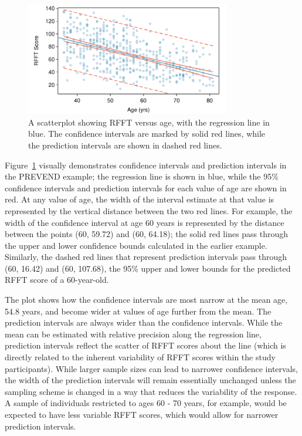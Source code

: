 \begin{figure}[h]
	\centering
	\includegraphics[width=0.8\textwidth]
	{ch_simple_linear_regression_oi_biostat/figures/prevendPredictionIntervalsSimpleRegression/prevendPredictionIntervalsSimpleRegression.pdf}
	\caption{A scatterplot showing RFFT versus age, with the regression line in blue. The confidence intervals are marked by solid red lines, while the prediction intervals are shown in dashed red lines.}
	\label{prevendPredictionIntervalsSimpleRegression}
\end{figure}

\textD{\newpage}

Figure~\ref{prevendPredictionIntervalsSimpleRegression} visually demonstrates confidence intervals and prediction intervals in the PREVEND example; the regression line is shown in blue, while the 95\% confidence intervals and prediction intervals for each value of age are shown in red. At any value of age, the width of the interval estimate at that value is represented by the vertical distance between the two red lines. For example, the width of the confidence interval at age 60 years is represented by the distance between the points (60, 59.72) and (60, 64.18); the solid red lines pass through the upper and lower confidence bounds calculated in the earlier example. Similarly, the dashed red lines that represent prediction intervals pass through (60, 16.42) and (60, 107.68), the 95\% upper and lower bounds for the predicted RFFT score of a 60-year-old.

The plot shows how the confidence intervals are most narrow at the mean age, 54.8 years, and become wider at values of age further from the mean. The prediction intervals are always wider than the confidence intervals. While the mean can be estimated with relative precision along the regression line, prediction intervals reflect the scatter of RFFT scores about the line (which is directly related to the inherent variability of RFFT scores within the study participants). While larger sample sizes can lead to narrower confidence intervals, the width of the prediction intervals will remain essentially unchanged unless the sampling scheme is changed in a way that reduces the variability of the response. A sample of individuals restricted to ages 60 - 70 years, for example, would be expected to have less variable RFFT scores, which would allow for narrower prediction intervals.

